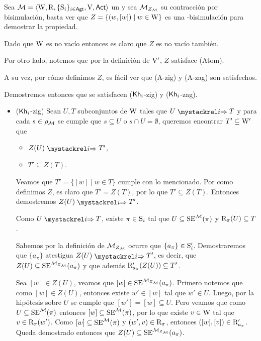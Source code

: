 \begin{demostracion}
    Sea $\model=\tup{\W,\R,\cset{\S_i}_{i \in \AGT},\V,\ACT}$ un \ults
    y sea $\fcont{\model}$ su contracción por bisimulación, basta ver que $Z = \{(w,[w]) \mid w \in\W\}$ es una \KHilogic-bisimulación 
    para demostrar la propiedad.

    Dado que $\W$ es no vacío entonces es claro que $Z$ es no vacío también.

    Por otro lado, notemos que por la definición de $\V'$, $Z$ satisface (Atom).

    A su vez, por cómo definimos $Z$, es fácil ver que (A-zig) y (A-zag) son satisfechos.
    
    Demostremos entonces que se satisfacen ($\khi$-zig) y ($\khi$-zag).

    \begin{itemize}
        \item ($\khi$-zig) Sean $U, T$ subconjuntos de $\W$ tales que $U \ultsExecAgi T$ y para cada $s \in \rho_\model$ se cumple que 
        $s \subseteq U$ o $s \cap U = \emptyset$, queremos encontrar $T' \subseteq \W'$ que

        \begin{multicols}{2}
            \begin{itemize}
                \item $Z(U) \ultsExecAgi T'$, 
                \item $T' \subseteq Z(T)$.
            \end{itemize}
        \end{multicols}

        Veamos que $T' = \{ [w] \mid w \in T\}$ cumple con lo mencionado. Por como definimos $Z$, es claro que $T'  = Z(T)$, por lo que 
        $T' \subseteq Z(T)$. Entonces demostremos $Z(U) \ultsExecAgi T'$.

        Como $U \ultsExecAgi T$, existe $\pi \in \S_i$ tal que $U \subseteq \sexec^{\model}(\pi)$ y 
        $\R_\pi(U) \subseteq T$. 

        Sabemos por la definición de $\fcont{\model}$ ocurre que $\{a_\pi\}\in\S'_i$. Demostraremos que $\{a_\pi\}$ 
        atestigua $Z(U) \ultsExecAgi T'$, es decir, que $Z(U) \subseteq \sexec^{\fcont{\model}}(a_\pi)$ y que además 
        $\R'_{a_\pi}(Z(U)) \subseteq T'$.

        Sea $[w] \in Z(U)$, veamos que $[w] \in \sexec^{\fcont{\model}}(a_\pi)$. Primero notemos que como $[w] \in Z(U)$, 
        entonces existe $w' \in [w]$ tal que $w' \in U$. Luego, por la hipótesis sobre $U$
        se cumple que $[w'] = [w] \subseteq U$. Pero veamos que como $U \subseteq \sexec^{\model}(\pi)$ entonces 
        $[w] \subseteq \sexec^{\model}(\pi)$, por lo que existe $v \in \W$ tal que $v \in \R_\pi(w')$. 
        Como $[w] \subseteq \sexec^{\model}(\pi)$ y $(w',v) \in \R_\pi$, entonces 
        $([w],[v]) \in \R'_{a_\pi}$. Queda demostrado entonces que $Z(U) \subseteq \sexec^{\fcont{\model}}(a_\pi)$.
        

\end{itemize}
\end{demostracion}
